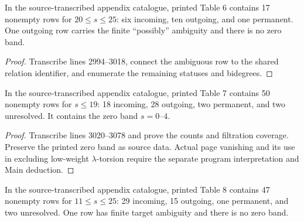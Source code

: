 \begin{proposition}
  \label{data:table-s125-high}
  \notready
  In the source-transcribed appendix catalogue, printed Table 6 contains 17 nonempty rows
  for $20\le s\le25$: six incoming, ten outgoing, and one permanent.  One
  outgoing row carries the finite ``possibly'' ambiguity and there is no zero
  band.
\end{proposition}

\begin{proof}
  Transcribe lines 2994--3018, connect the ambiguous row to the shared relation
  identifier, and enumerate the remaining statuses and bidegrees.
\end{proof}

\begin{proposition}
  \label{data:table-s125-low}
  \notready
  In the source-transcribed appendix catalogue, printed Table 7 contains 50 nonempty rows
  for $s\le19$: 18 incoming, 28 outgoing, two permanent, and two unresolved.
  It contains the zero band $s=0$--$4$.
\end{proposition}

\begin{proof}
  Transcribe lines 3020--3078 and prove the counts and filtration coverage.
  Preserve the printed zero band as source data. Actual page vanishing and
  its use in excluding low-weight $\lambda$-torsion require the separate
  program interpretation and Main deduction.
\end{proof}

\begin{proposition}
  \label{data:table-s126-high}
  \notready
  In the source-transcribed appendix catalogue, printed Table 8 contains 47 nonempty rows
  for $11\le s\le25$: 29 incoming, 15 outgoing, one permanent, and two
  unresolved.  One row has finite target ambiguity and there is no zero band.
\end{proposition}

